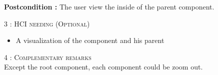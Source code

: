 \begin{flushleft}
    \textbf{\large Postcondition :} The user view the inside of the parent component.

    \BlackLine
    \textsc{\Large 3 : HCI needing (Optional)}\\[0.3cm]

    \begin{itemize}
        \item A visualization of the component and his parent
    \end{itemize}

    \BlackLine
    \textsc{\Large 4 : Complementary remarks}\\[0.3cm]

    Except the root component, each component could be zoom out.

\end{flushleft}
